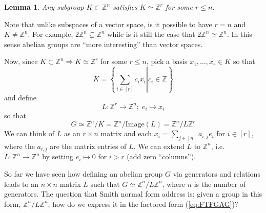 \documentclass[11pt,english]{article}
\newtheorem{lemma}[theorem]{Lemma}
\newcommand{\Z}{\mathbb Z}  %
\begin{document}
\begin{lemma}

Any subgroup $K\subset\mathbb{Z}^{n}$ satisfies $K\simeq\mathbb{Z}^{r}$
for some $r\le n$. 
\end{lemma}

Note that unlike subspaces of a vector space, is it possible to have $r=n$ and $K\neq\mathbb{Z}^{n}$.  For example, $2\mathbb{Z}^{n} \subsetneq \mathbb{Z}^{n}$ while is it still
the case that $2\mathbb{Z}^{n}\simeq\mathbb{Z}^{n}$.  In this sense abelian groups are ``more interesting'' than vector spaces.

Now, since $K\subset\mathbb{Z}^{n}\Rightarrow K\simeq\mathbb{Z}^{r}$
for some $r\le n$, pick a basis $x_{1},\ldots,x_{r}\in K$ so that\[
K=\left\{ \left.\sum_{i\in\left[r\right]}c_{i}x_{i}\right|c_{i}\in\mathbb{Z}\right\} \]
and define\[
L:\mathbb{Z}^{r}\rightarrow\mathbb{Z}^{n};\; e_{i}\mapsto x_{i}\]
so that 
\[
G \simeq \mathbb{Z}^{n}/K=\mathbb{Z}^{n}/\text{Image}\left(L\right)=\mathbb{Z}^{n}/L\mathbb{Z}^{r}\]
We can think of $L$ as an $r\times n$ matrix and each $x_{i}=\sum_{j\in\left[n\right]}a_{i,j}e_{i}$
for $i\in\left[r\right]$, where the $a_{i,j}$ are the matrix entries
of $L$.  We can extend $L$ to $\mathbb{Z}^{n}$, i.e. $L:\mathbb{Z}^{n}\rightarrow\mathbb{Z}^{n}$
by setting $e_{i}\mapsto0$ for $i>r$ (add zero {}``columns''). 

So far we have seen how defining an abelian group $G$ via generators and relations leads to an $n\times n$ matrix $L$ such that $G \simeq \Z^n / L\Z^n$, where $n$ is the number of generators.
The question that Smith normal form address is: given a group in this form, $\Z^n / L \Z^n$, how do we express it in the factored form (\ref{eq:FTFGAG})?
\end{document}
